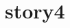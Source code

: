 \documentclass[ebook,12pt,oneside,openany]{memoir}
\begin{document}
\chapter{story4}
\end{document}
